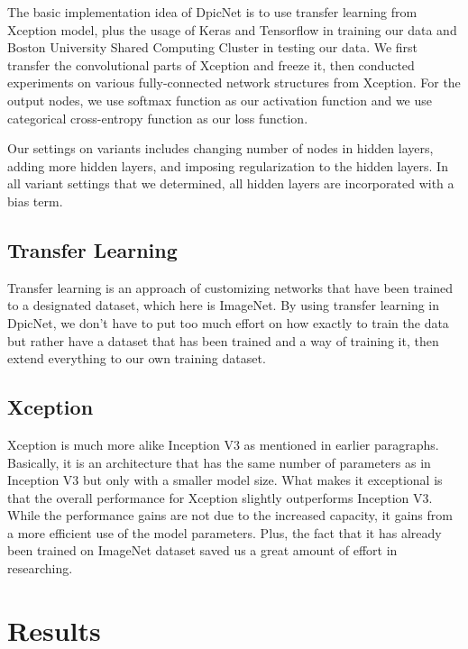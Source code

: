\documentclass{article}
\begin{document}
The basic implementation idea of DpicNet is to use transfer learning from Xception model, plus the usage of Keras and Tensorflow in training our data and Boston University Shared Computing Cluster in testing our data. We first transfer the convolutional parts of Xception and freeze it, then conducted experiments on various fully-connected network structures from Xception. For the output nodes, we use softmax function as our activation function and we use categorical cross-entropy function as our loss function.

Our settings on variants includes changing number of nodes in hidden layers, adding more hidden layers, and imposing regularization to the hidden layers. In all variant settings that we determined, all hidden layers are incorporated with a bias term.

\subsection{Transfer Learning}

Transfer learning is an approach of customizing networks that have been trained to a designated dataset, which here is ImageNet. By using transfer learning in DpicNet, we don't have to put too much effort on how exactly to train the data but rather have a dataset that has been trained and a way of training it, then extend everything to our own training dataset. 

\subsection{Xception}

Xception is much more alike Inception V3 as mentioned in earlier paragraphs. Basically, it is an architecture that has the same number of parameters as in Inception V3 but only with a smaller model size. What makes it exceptional is that the overall performance for Xception slightly outperforms Inception V3. While the performance gains are not due to the increased capacity, it gains from a more efficient use of the model parameters. Plus, the fact that it has already been trained on ImageNet dataset saved us a great amount of effort in researching.


\section{Results}
\end{document}
